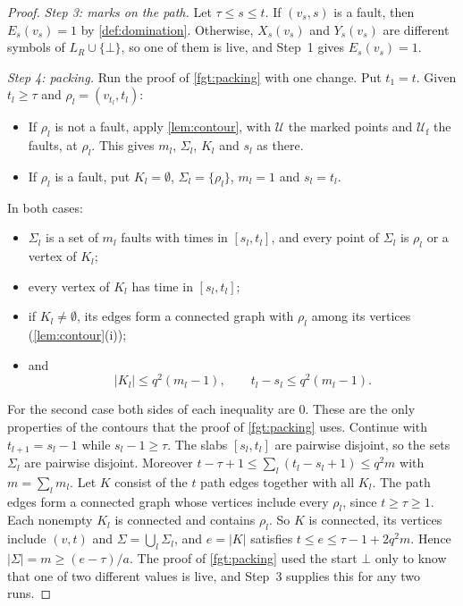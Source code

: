\begin{proof}
\emph{Step 3: marks on the path.} Let $\tau\le s\le t$. If $(v_s,s)$ is a fault,
then $E_s(v_s)=1$ by \cref{def:domination}. Otherwise, $X_s(v_s)$ and $Y_s(v_s)$ are
different symbols of $L_R\cup\{\bot\}$, so one of them is live, and Step~1 gives
$E_s(v_s)=1$.

\emph{Step 4: packing.} Run the proof of \cref{fgt:packing} with one change. Put
$t_1=t$. Given $t_l\ge\tau$ and $\rho_l=(v_{t_l},t_l)$:
\begin{itemize}
\item If $\rho_l$ is not a fault, apply \cref{lem:contour}, with $\mathcal U$ the
marked points and $\mathcal U_{\mathrm f}$ the faults, at $\rho_l$. This gives
$m_l$, $\Sigma_l$, $K_l$ and $s_l$ as there.
\item If $\rho_l$ is a fault, put $K_l=\emptyset$, $\Sigma_l=\{\rho_l\}$, $m_l=1$
and $s_l=t_l$.
\end{itemize}
In both cases:
\begin{itemize}
\item $\Sigma_l$ is a set of $m_l$ faults with times in $[s_l,t_l]$, and every point
of $\Sigma_l$ is $\rho_l$ or a vertex of $K_l$;
\item every vertex of $K_l$ has time in $[s_l,t_l]$;
\item if $K_l\ne\emptyset$, its edges form a connected graph with $\rho_l$ among its
vertices (\cref{lem:contour}(i));
\item and
\[
|K_l|\le q^2(m_l-1),\qquad t_l-s_l\le q^2(m_l-1).
\]
\end{itemize}
For the second case both sides of each inequality are $0$. These are the only
properties of the contours that the proof of \cref{fgt:packing} uses. Continue with
$t_{l+1}=s_l-1$ while $s_l-1\ge\tau$. The slabs $[s_l,t_l]$ are pairwise disjoint,
so the sets $\Sigma_l$ are pairwise disjoint. Moreover
$t-\tau+1\le\sum_l(t_l-s_l+1)\le q^2m$ with $m=\sum_l m_l$. Let $K$ consist of the
$t$ path edges together with all $K_l$. The path edges form a connected graph whose
vertices include every $\rho_l$, since $t\ge\tau\ge1$. Each nonempty $K_l$ is
connected and contains $\rho_l$. So $K$ is connected, its vertices include $(v,t)$
and $\Sigma=\bigcup_l\Sigma_l$, and $e=|K|$ satisfies $t\le e\le\tau-1+2q^2m$. Hence
$|\Sigma|=m\ge(e-\tau)/a$. The proof of \cref{fgt:packing} used the start $\bot$
only to know that one of two different values is live, and Step~3 supplies this for
any two runs.


\end{proof}
